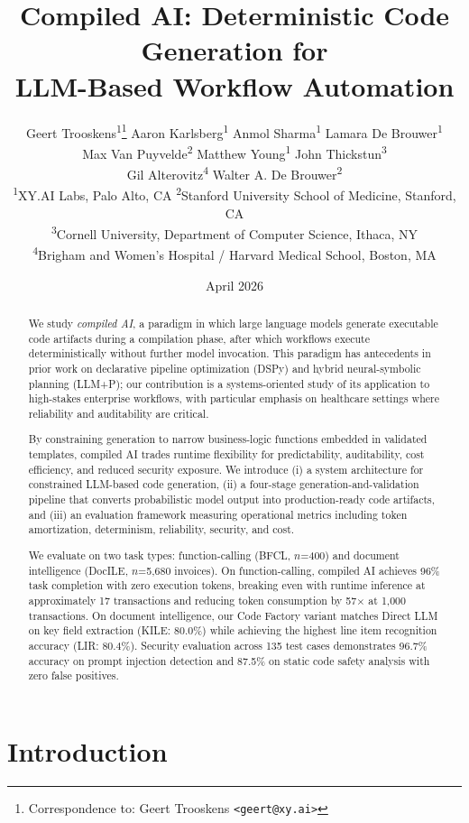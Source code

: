 \documentclass[11pt]{article}
\title{Compiled AI: Deterministic Code Generation for\\LLM-Based Workflow Automation}
\author{
  Geert Trooskens\textsuperscript{1}\thanks{Correspondence to: Geert Trooskens \texttt{<geert@xy.ai>}} \quad
  Aaron Karlsberg\textsuperscript{1} \quad
  Anmol Sharma\textsuperscript{1} \quad
  Lamara De Brouwer\textsuperscript{1} \\[0.3em]
  Max Van Puyvelde\textsuperscript{2} \quad
  Matthew Young\textsuperscript{1} \quad
  John Thickstun\textsuperscript{3} \\[0.3em]
  Gil Alterovitz\textsuperscript{4} \quad
  Walter A. De Brouwer\textsuperscript{2}
  \\[1em]
  \textsuperscript{1}XY.AI Labs, Palo Alto, CA \quad
  \textsuperscript{2}Stanford University School of Medicine, Stanford, CA \\
  \textsuperscript{3}Cornell University, Department of Computer Science, Ithaca, NY \\
  \textsuperscript{4}Brigham and Women's Hospital / Harvard Medical School, Boston, MA
}
\date{April 2026}
\begin{document}
\maketitle

\begin{abstract}

We study \emph{compiled AI}, a paradigm in which large language models generate executable code artifacts during a compilation phase, after which workflows execute deterministically without further model invocation. This paradigm has antecedents in prior work on declarative pipeline optimization (DSPy) and hybrid neural-symbolic planning (LLM+P); our contribution is a systems-oriented study of its application to high-stakes enterprise workflows, with particular emphasis on healthcare settings where reliability and auditability are critical.

By constraining generation to narrow business-logic functions embedded in validated templates, compiled AI trades runtime flexibility for predictability, auditability, cost efficiency, and reduced security exposure. We introduce (i) a system architecture for constrained LLM-based code generation, (ii) a four-stage generation-and-validation pipeline that converts probabilistic model output into production-ready code artifacts, and (iii) an evaluation framework measuring operational metrics including token amortization, determinism, reliability, security, and cost.

We evaluate on two task types: function-calling (BFCL, $n$=400) and document intelligence (DocILE, $n$=5,680 invoices). On function-calling, compiled AI achieves 96\% task completion with zero execution tokens, breaking even with runtime inference at approximately 17 transactions and reducing token consumption by 57$\times$ at 1,000 transactions. On document intelligence, our Code Factory variant matches Direct LLM on key field extraction (KILE: 80.0\%) while achieving the highest line item recognition accuracy (LIR: 80.4\%). Security evaluation across 135 test cases demonstrates 96.7\% accuracy on prompt injection detection and 87.5\% on static code safety analysis with zero false positives.

\end{abstract}

\section{Introduction}
\label{sec:introduction}
\end{document}
